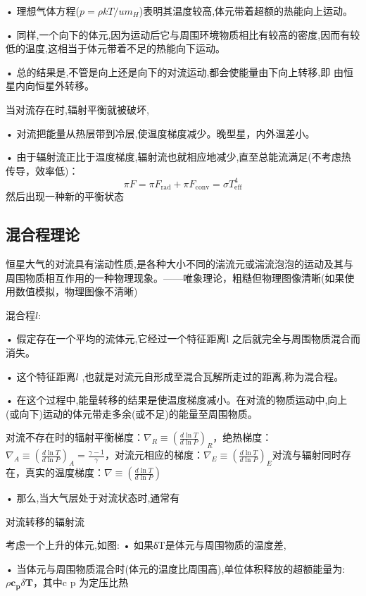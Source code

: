 \documentclass[UTF8]{article}
\begin{document}
\begin{fangsong}
• 理想气体方程($p = \rho k T / u m _ { H }$)表明其温度较高,体元带着超额的热能向上运动。

• 同样,一个向下的体元,因为运动后它与周围环境物质相比有较高的密度,因而有较低的温度,这相当于体元带着不足的热能向下运动。

• 总的结果是,不管是向上还是向下的对流运动,都会使能量由下向上转移,即
由恒星内向恒星外转移。

当对流存在时,辐射平衡就被破坏,

• 对流把能量从热层带到冷层,使温度梯度减少。晚型星，内外温差小。

• 由于辐射流正比于温度梯度,辐射流也就相应地减少,直至总能流满足(不考虑热传导，效率低)：
$$\pi F = \pi F _ { \mathrm { rad } } + \pi F _ { \mathrm { conv } } = \sigma T _ { \mathrm { eff } } ^ { 4 }$$
然后出现一种新的平衡状态

\subsection{混合程理论}
恒星大气的对流具有湍动性质,是各种大小不同的湍流元或湍流泡泡的运动及其与周围物质相互作用的一种物理现象。——唯象理论，粗糙但物理图像清晰(如果使用数值模拟，物理图像不清晰)

\noindent 混合程$l$:

• 假定存在一个平均的流体元,它经过一个特征距离l 之后就完全与周围物质混合而消失。

• 这个特征距离$l$ ,也就是对流元自形成至混合瓦解所走过的距离,称为混合程。

• 在这个过程中,能量转移的结果是使温度梯度减小。在对流的物质运动中,向上(或向下)运动的体元带走多余(或不足)的能量至周围物质。

对流不存在时的辐射平衡梯度：$\nabla _ { R } \equiv \left( \frac { d \ln T } { d \ln P } \right) _ { R }$，绝热梯度：$\nabla _ { A } \equiv \left( \frac { d \ln T } { d \ln P } \right) _ { A } = \frac { \gamma - 1 } { \gamma }$，对流元相应的梯度：$\nabla _ { E } \equiv \left( \frac { d \ln T } { d \ln P } \right) _ { E }$对流与辐射同时存在，真实的温度梯度：$\nabla \equiv \left( \frac { d \ln T } { d \ln P } \right)$

• 那么,当大气层处于对流状态时,通常有

\noindent 对流转移的辐射流

考虑一个上升的体元,如图:
• 如果δT是体元与周围物质的温度差,

• 当体元与周围物质混合时(体元的温度比周围高),单位体积释放的超额能量为:$\rho \mathbf { c } _ { \mathbf { p } } \delta \mathbf { T }$，其中c p 为定压比热


\end{fangsong}
\end{document}
